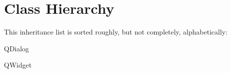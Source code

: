 \section{Class Hierarchy}
This inheritance list is sorted roughly, but not completely, alphabetically\-:\begin{DoxyCompactList}
\item {}
\item {}
\item Q\-Dialog\begin{DoxyCompactList}
\item {}
\end{DoxyCompactList}
\item Q\-Widget\begin{DoxyCompactList}
\item {}
\end{DoxyCompactList}
\end{DoxyCompactList}

